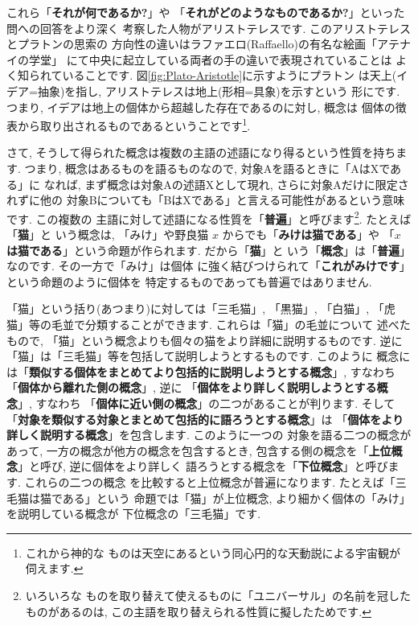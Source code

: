 \documentclass[b5j,8pt,twocolumn]{ltjsarticle}
\begin{document}
これら「\textbf{それが何であるか?}」や
「\textbf{それがどのようなものであるか?}」といった問への回答をより深く
考察した人物がアリストテレスです. このアリストテレスとプラトンの思索の
方向性の違いはラファエロ(Raffaello)の有名な絵画「アテナイの学堂」
\cite{アテナイ}にて中央に起立している両者の手の違いで表現されていることは
よく知られていることです. 図\ref{fig:Plato-Aristotle}に示すようにプラトン
は天上(イデア=抽象)を指し, アリストテレスは地上(形相=具象)を示すという
形にです. つまり, イデアは地上の個体から超越した存在であるのに対し, 概念は
個体の徴表から取り出されるものであるということです\footnote{これから神的な
ものは天空にあるという同心円的な天動説による宇宙観が伺えます.}.
\newline

さて, そうして得られた概念は複数の主語の述語になり得るという性質を持ちます.
 つまり, 概念はあるものを語るものなので, 対象Aを語るときに「AはXである」に
なれば, まず概念は対象Aの述語Xとして現れ, さらに対象Aだけに限定されずに他の
対象Bについても「BはXである」と言える可能性があるという意味です. この複数の
主語に対して述語になる性質を「\textbf{普遍}」と呼びます\footnote{いろいろな
ものを取り替えて使えるものに「ユニバーサル」の名前を冠したものがあるのは,
 この主語を取り替えられる性質に擬したためです.}. たとえば「\textbf{猫}」と
いう概念は, 「みけ」や野良猫 $x$ からでも「\textbf{みけは猫である}」や
「\textbf{$x$ は猫である}」という命題が作られます. だから「\textbf{猫}」と
いう「\textbf{概念}」は「\textbf{普遍}」なのです. その一方で「みけ」は個体
に強く結びつけられて「\textbf{これがみけです}」という命題のように個体を
特定するものであっても普遍ではありません.
\newline

「猫」という括り(あつまり)に対しては「三毛猫」, 「黒猫」, 「白猫」,
 「虎猫」等の毛並で分類することができます. これらは「猫」の毛並について
述べたもので, 「猫」という概念よりも個々の猫をより詳細に説明するものです.
 逆に「猫」は「三毛猫」等を包括して説明しようとするものです. このように
概念には「\textbf{類似する個体をまとめてより包括的に説明しようとする概念}」,
 すなわち「\textbf{個体から離れた側の概念}」, 逆に
「\textbf{個体をより詳しく説明しようとする概念}」, すなわち
「\textbf{個体に近い側の概念}」の二つがあることが判ります. そして
「\textbf{対象を類似する対象とまとめて包括的に語ろうとする概念}」は
「\textbf{個体をより詳しく説明する概念}」を包含します. このように一つの
対象を語る二つの概念があって, 一方の概念が他方の概念を包含するとき,
 包含する側の概念を「\textbf{上位概念}」と呼び, 逆に個体をより詳しく
語ろうとする概念を「\textbf{下位概念}」と呼びます. これらの二つの概念
を比較すると上位概念が普遍になります. たとえば「三毛猫は猫である」という
命題では「猫」が上位概念, より細かく個体の「みけ」を説明している概念が
下位概念の「三毛猫」です.
\newline
\end{document}
